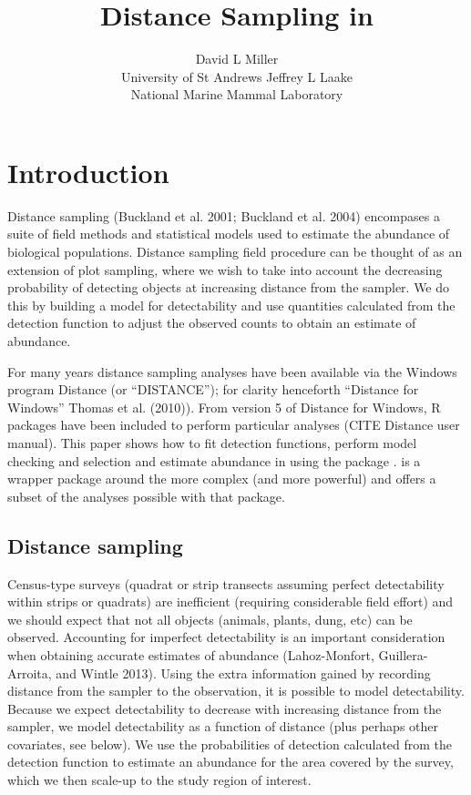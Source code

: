 \documentclass[article]{jss}
\author{
David L Miller\\University of St Andrews \And Jeffrey L Laake\\National Marine Mammal Laboratory
}
\title{Distance Sampling in \proglang{R}}
\begin{document}
\section{Introduction}\label{introduction}

Distance sampling (Buckland et al. 2001; Buckland et al. 2004)
encompases a suite of field methods and statistical models used to
estimate the abundance of biological populations. Distance sampling
field procedure can be thought of as an extension of plot sampling,
where we wish to take into account the decreasing probability of
detecting objects at increasing distance from the sampler. We do this by
building a model for detectability and use quantities calculated from
the detection function to adjust the observed counts to obtain an
estimate of abundance.

For many years distance sampling analyses have been available via the
Windows program Distance (or ``DISTANCE''); for clarity henceforth
``Distance for Windows'' Thomas et al. (2010)). From version 5 of
Distance for Windows, R packages have been included to perform
particular analyses (CITE Distance user manual). This paper shows how to
fit detection functions, perform model checking and selection and
estimate abundance in  using the package .
 is a wrapper package around the more complex (and more
powerful)  and offers a subset of the analyses possible with
that package.

\subsection{Distance sampling}\label{distance-sampling}

Census-type surveys (quadrat or strip transects assuming perfect
detectability within strips or quadrats) are inefficient (requiring
considerable field effort) and we should expect that not all objects
(animals, plants, dung, etc) can be observed. Accounting for imperfect
detectability is an important consideration when obtaining accurate
estimates of abundance (Lahoz-Monfort, Guillera-Arroita, and Wintle
2013). Using the extra information gained by recording distance from the
sampler to the observation, it is possible to model detectability.
Because we expect detectability to decrease with increasing distance
from the sampler, we model detectability as a function of distance (plus
perhaps other covariates, see below). We use the probabilities of
detection calculated from the detection function to estimate an
abundance for the area covered by the survey, which we then scale-up to
the study region of interest.
\end{document}
